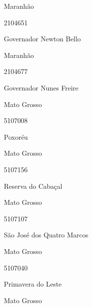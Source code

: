 \documentclass[
  letterpaper,
]{report}
\begin{document}
\n    

\n      

Maranhão

\n      

2104651

\n      

Governador Newton Bello

\n    

\n    

\n      

Maranhão

\n      

2104677

\n      

Governador Nunes Freire

\n    

\n    

\n      

Mato Grosso

\n      

5107008

\n      

Poxoréu

\n    

\n    

\n      

Mato Grosso

\n      

5107156

\n      

Reserva do Cabaçal

\n    

\n    

\n      

Mato Grosso

\n      

5107107

\n      

São José dos Quatro Marcos

\n    

\n    

\n      

Mato Grosso

\n      

5107040

\n      

Primavera do Leste

\n    

\n    

\n      

Mato Grosso
\end{document}
